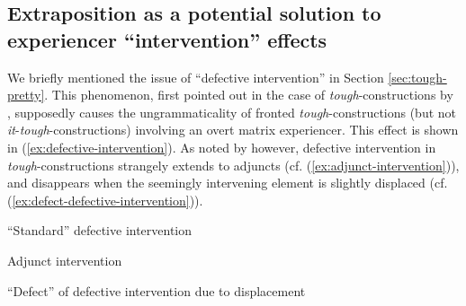 \documentclass[11pt]{article}
\begin{document}
\subsection{Extraposition as a potential solution to experiencer ``intervention'' effects}\label{sec:intervention-extraposition}
We briefly mentioned the issue of ``defective intervention'' in Section \ref{sec:tough-pretty}. This phenomenon, first pointed out in the case of \textit{tough}-constructions by \cite{Hartman2011}, supposedly causes the ungrammaticality of fronted \textit{tough}-constructions (but not \textit{it}-\textit{tough}-constructions) involving an overt matrix experiencer. This effect is shown in (\ref{ex:defective-intervention}). As noted by \cite{Bruening2014} however, defective intervention in \textit{tough}-constructions strangely extends to adjuncts (cf. (\ref{ex:adjunct-intervention})), and disappears when the seemingly intervening element is slightly displaced (cf. (\ref{ex:defect-defective-intervention})).\iffalse Moreover, as noted by \cite{Longenbaugh2015}, grammatical experiencers in fronted \textit{tough}-constructions behave like matrix PPs, and not like subjects of the embedded clause; which casts further doubts on the fact that ``defective intervention'' is really an intervention effect at the matrix level (\ref{ex:ftc-matrix-pp}).\fi
\begin{exe}
	\ex ``Standard'' defective intervention \cite{Hartman2011}
	\begin{xlist}
	\end{xlist}\label{ex:defective-intervention}
	\ex Adjunct intervention \cite{Bruening2014}
	\begin{xlist}
	\end{xlist}\label{ex:adjunct-intervention}
	\ex ``Defect'' of defective intervention due to displacement \cite{Bruening2014}
	\begin{xlist}
	\end{xlist}\label{ex:defect-defective-intervention}
	\iffalse
	\ex \textit{Grammatical experiencers in fronted \textit{tough}-constructions are not subjects of a \textit{for}-CP}
	\begin{xlist}
		\ex[] {Cucumbers are easy for Sue to grow but they're hard for Bill (to)\footnotemark\hfill Experiencer stranding}
		\ex[] {It will be tough for Mary$_i$ PRO$_{i+j}$ to meet at that café.\hfill Partial control} 
	\end{xlist}\label{ex:ftc-matrix-pp}
	\fi
\end{exe}
\end{document}
